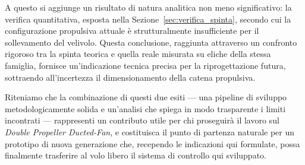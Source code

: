 \documentclass[11pt]{report}
\begin{document}
	A questo si aggiunge un risultato di natura analitica non meno significativo: la verifica quantitativa, esposta nella Sezione~\ref{sec:verifica_spinta}, secondo cui la configurazione propulsiva attuale è strutturalmente insufficiente per il sollevamento del velivolo. Questa conclusione, raggiunta attraverso un confronto rigoroso tra la spinta teorica e quella reale misurata su eliche della stessa famiglia, fornisce un'indicazione tecnica precisa per la riprogettazione futura, sottraendo all'incertezza il dimensionamento della catena propulsiva.
	
	Riteniamo che la combinazione di questi due esiti --- una pipeline di sviluppo metodologicamente solida e un'analisi che spiega in modo trasparente i limiti incontrati --- rappresenti un contributo utile per chi proseguirà il lavoro sul \textit{Double Propeller Ducted-Fan}, e costituisca il punto di partenza naturale per un prototipo di nuova generazione che, recependo le indicazioni qui formulate, possa finalmente trasferire al volo libero il sistema di controllo qui sviluppato.
	
	
	
\end{document}
